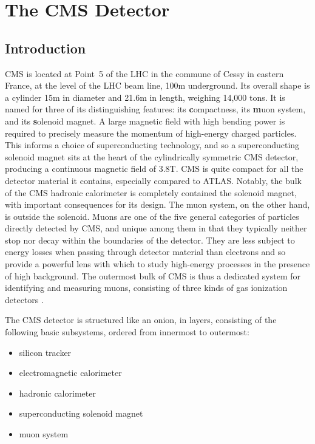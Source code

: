 \section{The CMS Detector}
\subsection{Introduction}
\label{cms:intro}
CMS is located at Point~5 of the LHC in the commune of Cessy in eastern France, at the level of the LHC beam line, 100\unit{m} underground.
Its overall shape is a cylinder 15\unit{m} in diameter and 21.6\unit{m} in length, weighing 14,000 tons.
It is named for three of its distinguishing features: its \textbf{c}ompactness, its \textbf{m}uon system, and its \textbf{s}olenoid magnet.
A large magnetic field with high bending power is required to precisely measure the momentum of high-energy charged particles.
This informs a choice of superconducting technology, and so a superconducting solenoid magnet sits at the heart of the cylindrically symmetric CMS detector, producing a continuous magnetic field of 3.8\unit{T}.
CMS is quite compact for all the detector material it contains, especially compared to ATLAS.
Notably, the bulk of the CMS hadronic calorimeter is completely contained the solenoid magnet, with important consequences for its design.
The muon system, on the other hand, is outside the solenoid.
Muons are one of the five general categories of particles directly detected by CMS, and unique among them in that they typically neither stop nor decay within the boundaries of the detector.
They are less subject to energy losses when passing through detector material than electrons and so provide a powerful lens with which to study high-energy processes in the presence of high background.
The outermost bulk of CMS is thus a dedicated system for identifying and measuring muons, consisting of three kinds of gas ionization detectors \cite{Chatrchyan:2008zzk}.

The CMS detector is structured like an onion, in layers, consisting of the following basic subsystems, ordered from innermost to outermost:
\begin{itemize}
  \item silicon tracker
  \item electromagnetic calorimeter
  \item hadronic calorimeter
  \item superconducting solenoid magnet
  \item muon system
\end{itemize}

